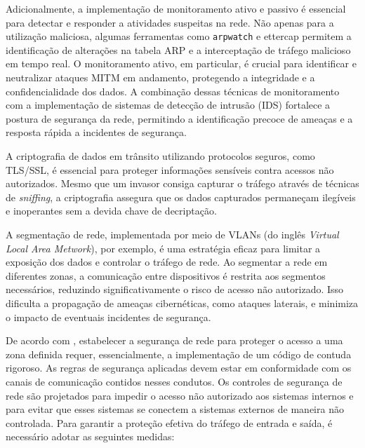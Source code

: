         Adicionalmente, a implementação de monitoramento ativo e passivo é essencial para detectar e responder a atividades suspeitas na rede. Não apenas para a utilização maliciosa, algumas ferramentas como \texttt{arpwatch} e ettercap permitem a identificação de alterações na tabela ARP e a interceptação de tráfego malicioso em tempo real. O monitoramento ativo, em particular, é crucial para identificar e neutralizar ataques MITM em andamento, protegendo a integridade e a confidencialidade dos dados. A combinação dessas técnicas de monitoramento com a implementação de sistemas de detecção de intrusão (IDS) fortalece a postura de segurança da rede, permitindo a identificação precoce de ameaças e a resposta rápida a incidentes de segurança. %

        A criptografia de dados em trânsito utilizando protocolos seguros, como TLS/SSL, é essencial para proteger informações sensíveis contra acessos não autorizados. Mesmo que um invasor consiga capturar o tráfego através de técnicas de \textit{sniffing}, a criptografia assegura que os dados capturados permaneçam ilegíveis e inoperantes sem a devida chave de decriptação.
        
        A segmentação de rede, implementada por meio de VLANs (do inglês \textit{Virtual Local Area Metwork}), por exemplo, é uma estratégia eficaz para limitar a exposição dos dados e controlar o tráfego de rede. Ao segmentar a rede em diferentes zonas, a comunicação entre dispositivos é restrita aos segmentos necessários, reduzindo significativamente o risco de acesso não autorizado. Isso dificulta a propagação de ameaças cibernéticas, como ataques laterais, e minimiza o impacto de eventuais incidentes de segurança.

        De acordo com , estabelecer a segurança de rede para proteger o acesso a uma zona definida requer, essencialmente, a implementação de um código de contuda rigoroso. As regras de segurança aplicadas devem estar em conformidade com os canais de comunicação contidos nesses condutos. Os controles de segurança de rede são projetados para impedir o acesso não autorizado aos sistemas internos e para evitar que esses sistemas se conectem a sistemas externos de maneira não controlada. Para garantir a proteção efetiva do tráfego de entrada e saída, é necessário adotar as seguintes medidas:

